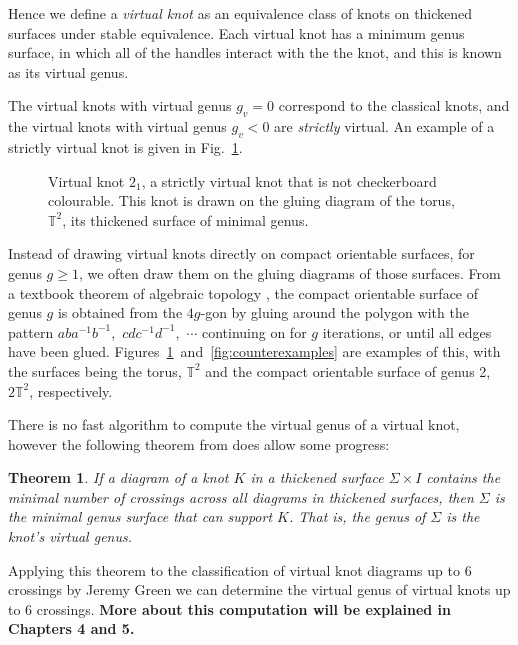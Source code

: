 \documentclass[12pt]{report}
\newcommand{\T}{\mathbb{T}}
\newcommand{\noteblue}[1]{{\color{Blue} \textbf{#1}}}
\newtheorem*{theorem}{Theorem}
\begin{document}
Hence we define a \textit{virtual knot} as an equivalence class of knots on thickened surfaces under stable equivalence. Each virtual knot has a minimum genus surface, in which all of the handles interact with the the knot, and this is known as its virtual genus.

The virtual knots with virtual genus $g_{v} = 0$ correspond to the classical knots, and the virtual knots with virtual genus $g_{v} < 0$ are \textit{strictly} virtual. An example of a strictly virtual knot is given in Fig.~\ref{fig:not-checkerboard-colourable}.

\begin{figure}[hbt]
	\centering
	\def\svgscale{0.35}
	
	\caption{Virtual knot $2_{1}$, a strictly virtual knot that is not checkerboard colourable. This knot is drawn on the gluing diagram of the torus, $\T^{2}$, its thickened surface of minimal genus.}
	\label{fig:not-checkerboard-colourable}
\end{figure}

Instead of drawing virtual knots directly on compact orientable surfaces, for genus $g \geq 1$, we often draw them on the gluing diagrams of those surfaces. From a textbook theorem of algebraic topology \parencite{algebraic-topology}, the compact orientable surface of genus $g$ is obtained from the $4g$-gon by gluing around the polygon with the pattern $aba^{-1}b^{-1}$,~$cdc^{-1}d^{-1}$,~$\cdots$ continuing on for $g$ iterations, or until all edges have been glued. Figures~\ref{fig:not-checkerboard-colourable}~and~\ref{fig:counterexamples} are examples of this, with the surfaces being the torus, $\T^{2}$ and the compact orientable surface of genus 2, $2\T^{2}$, respectively.

There is no fast algorithm to compute the virtual genus of a virtual knot, however the following theorem from \cite{parity-and-projection} does allow some progress:
\begin{theorem}
	If a diagram of a knot $K$ in a thickened surface $\Sigma \times I$ contains the minimal number of crossings across all diagrams in thickened surfaces, then $\Sigma$ is the minimal genus surface that can support $K$. That is, the genus of $\Sigma$ is the knot's virtual genus.
\end{theorem}
Applying this theorem to the classification of virtual knot diagrams up to $6$ crossings by Jeremy Green \cite{virtual-knot-table} we can determine the virtual genus of virtual knots up to $6$ crossings. \noteblue{More about this computation will be explained in Chapters 4 and 5.}
\end{document}
